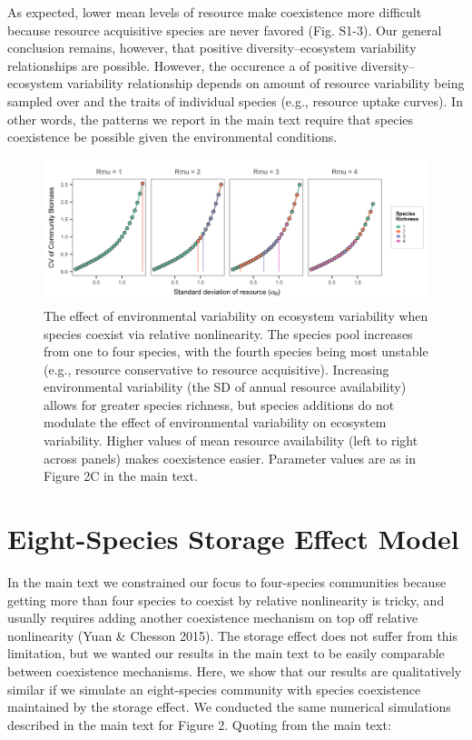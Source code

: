 \documentclass[11pt,]{article}
\begin{document}
As expected, lower mean levels of resource make coexistence more
difficult because resource acquisitive species are never favored (Fig.
S1-3). Our general conclusion remains, however, that positive
diversity--ecosystem variability relationships are possible. However,
the occurence a of positive diversity--ecosystem variability
relationship depends on amount of resource variability being sampled
over and the traits of individual species (e.g., resource uptake
curves). In other words, the patterns we report in the main text require
that species coexistence be possible given the environmental conditions.

\begin{figure}[!ht]
  \centering
      \includegraphics[width=6in]{./components/SI_relative_nonlinearity_four_rmus.png}
  \caption{The effect of environmental variability on ecosystem variability when species coexist via relative nonlinearity. The species pool increases from one to four species, with the fourth species being most unstable (e.g., resource conservative to resource acquisitive). Increasing environmental variability (the SD of annual resource availability) allows for greater species richness, but species additions do not modulate the effect of environmental variability on ecosystem variability. Higher values of mean resource availability (left to right across panels) makes coexistence easier. Parameter values are as in Figure 2C in the main text.}
\end{figure}

\newpage{}

\section{Eight-Species Storage Effect Model}

In the main text we constrained our focus to four-species communities
because getting more than four species to coexist by relative
nonlinearity is tricky, and usually requires adding another coexistence
mechanism on top off relative nonlinearity (Yuan \& Chesson 2015). The
storage effect does not suffer from this limitation, but we wanted our
results in the main text to be easily comparable between coexistence
mechanisms. Here, we show that our results are qualitatively similar if
we simulate an eight-species community with species coexistence
maintained by the storage effect. We conducted the same numerical
simulations described in the main text for Figure 2. Quoting from the
main text:
\end{document}
